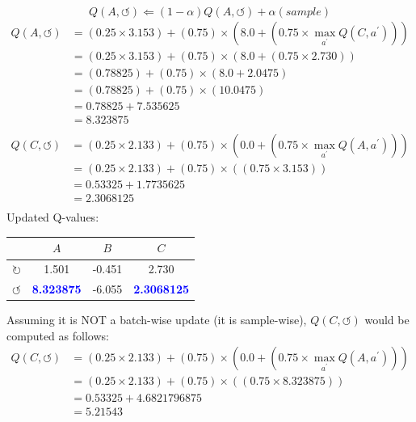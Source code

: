 \documentclass{homework}
\def\clockwise{\circlearrowright}
\def\counterclockwise{\circlearrowleft}
\begin{document}
\begin{equation*}
    Q(A, \counterclockwise) \Leftarrow (1 - \alpha) Q(A, \counterclockwise) + \alpha (sample)
\end{equation*}
\begin{align*}
    Q(A, \counterclockwise) &= (0.25 \times 3.153 ) + (0.75) \times ( 8.0 + (0.75 \times \max\limits_{a^{\prime}} Q(C, a^{\prime})) )\\
     &= (0.25 \times 3.153 ) + (0.75) \times ( 8.0 + (0.75 \times 2.730) )\\
     &= (0.78825) + (0.75) \times ( 8.0 + 2.0475 )\\
     &= (0.78825) + (0.75) \times ( 10.0475 )\\
     &= 0.78825 + 7.535625\\
     &= 8.323875\\
\end{align*}
\begin{align*}
    Q(C, \counterclockwise) &= (0.25 \times 2.133 ) + (0.75) \times ( 0.0 + (0.75 \times \max\limits_{a^{\prime}} Q(A, a^{\prime})) )\\
     &= (0.25 \times 2.133 ) + (0.75) \times ( (0.75 \times 3.153) )\\
     &= 0.53325 + 1.7735625\\
     &= 2.3068125\\
\end{align*}
Updated Q-values:
\begin{table}[h!]
    \centering
    \begin{tabular}{cccc}
        \toprule
        & $A$ & $B$ & $C$ \\
        \midrule
        $\clockwise$ & 1.501 & -0.451 & 2.730 \\
        $\counterclockwise$ & \textbf{\textcolor{blue}{8.323875}} & -6.055 & \textbf{\textcolor{blue}{2.3068125}} \\
        \bottomrule
    \end{tabular}
\end{table}

Assuming it is NOT a batch-wise update (it is sample-wise), $Q(C, \counterclockwise)$ would be computed as follows:
\begin{align*}
    Q(C, \counterclockwise) &= (0.25 \times 2.133 ) + (0.75) \times ( 0.0 + (0.75 \times \max\limits_{a^{\prime}} Q(A, a^{\prime})) )\\
     &= (0.25 \times 2.133 ) + (0.75) \times ( (0.75 \times 8.323875) )\\
     &= 0.53325 + 4.6821796875\\
     &= 5.21543\\
\end{align*}
\end{document}
